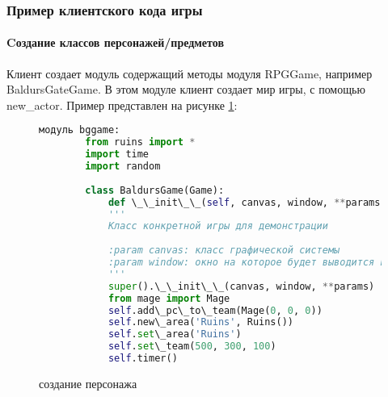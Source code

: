 \subsubsection{Пример клиентского кода игры}
\paragraph{Cоздание классов персонажей/предметов}
Клиент создает модуль содержащий методы модуля RPGGame, например BaldursGateGame. В этом модуле клиент создает мир игры, с помощью new\_actor.
Пример представлен на рисунке \ref{answer:image}:
\begin{figure}[H]
	\begin{lstlisting}[language=Python]
		модуль bggame:
		from ruins import *
		import time
		import random
		
		class BaldursGame(Game):
			def \_\_init\_\_(self, canvas, window, **params):
			'''
			Класс конкретной игры для демонстрации
		
			:param canvas: класс графической системы
			:param window: окно на которое будет выводится игра
			'''
			super().\_\_init\_\_(canvas, window, **params)
			from mage import Mage
			self.add\_pc\_to\_team(Mage(0, 0, 0))
			self.new\_area('Ruins', Ruins())
			self.set\_area('Ruins')
			self.set\_team(500, 300, 100)
			self.timer()
	\end{lstlisting}  
\caption{создание персонажа}
\label{answer:image}
\end{figure}


